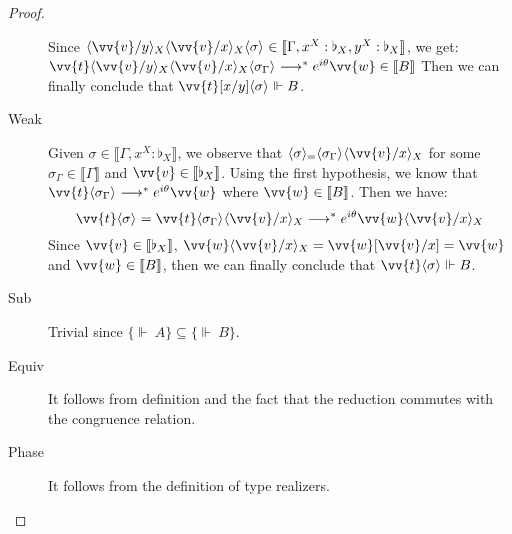 \documentclass[runningheads,orivec,envcountsame,envcountsect]{llncs}
\newcommand\lra{\longrightarrow}
\newcommand\ansubst[2]{\ensuremath{\langle #1 \rangle_{#2}}}
\def\eval{\lra^*}
\def\sem#1{\llbracket#1\rrbracket}
\def\semr#1{\{{\real}~#1\}}
\def\real{\Vdash}
\newcommand\basis[1]{\ensuremath{\flat_{#1}}}
\begin{document}
\begin{proof}
\begin{description}
    Since $\ansubst{\vv{v}/y}{X}\ansubst{\vv{v}/x}{X}\ansubst{\sigma}{}\in\sem{\Gamma, x^X:\basis{X}, y^X:\basis{X}}$, we get: $\vv{t}\ansubst{\vv{v}/y}{X}\ansubst{\vv{v}/x}{X}\ansubst{\sigma_\Gamma}{}\eval e^{i\theta}\vv{w}\in\sem{B}$
    Then we can finally conclude that $\vv{t}[x/y]\ansubst{\sigma}{}\real B$.

    \item[Weak] Given $\sigma\in\sem{\Gamma,x^X:\basis{X}}$, we observe that $\ansubst{\sigma}=\ansubst{\sigma_\Gamma}{}\ansubst{\vv{v}/x}{X}$ for some $\sigma_\Gamma\in\sem{\Gamma}$ and $\vv{v}\in\sem{\basis{X}}$. Using the first hypothesis, we know that $\vv{t}\ansubst{\sigma_\Gamma}{}\eval e^{i\theta}\vv{w}$ where $\vv{w}\in\sem{B}$. Then we have:
    \[
    \vv{t}\ansubst{\sigma}{}=\vv{t}\ansubst{\sigma_\Gamma}{}\ansubst{\vv{v}/x}{X}\eval e^{i\theta}\vv{w}\ansubst{\vv{v}/x}{X}
    \]
    Since $\vv{v}\in\sem{\basis{X}}$, $\vv{w}\ansubst{\vv{v}/x}{X}=\vv{w}[\vv{v}/x]=\vv{w}$ and $\vv{w}\in\sem{B}$, then we can finally conclude that $\vv{t}\ansubst{\sigma}{}\real B$.
    
    \item[Sub] Trivial since $\semr{A}\subseteq\semr{B}$. 

    \item[Equiv] It follows from definition and the fact that the reduction commutes with the congruence relation.
    
    \item[Phase] It follows from the definition of type realizers.
    \end{description}
\end{proof}
\end{document}
